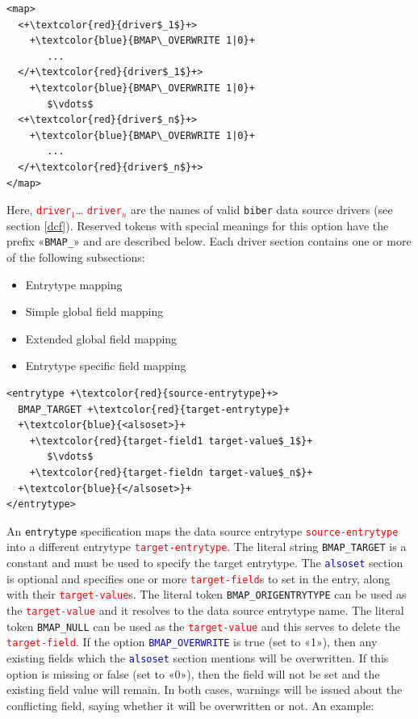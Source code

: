 \documentclass{ltxdockit}
\begin{document}
\lstset{showspaces=false}
\begin{lstlisting}[escapechar=+,mathescape=true]
<map>
  <+\textcolor{red}{driver$_1$}+>
    +\textcolor{blue}{BMAP\_OVERWRITE 1|0}+
       ...
  </+\textcolor{red}{driver$_1$}+>
    +\textcolor{blue}{BMAP\_OVERWRITE 1|0}+
       $\vdots$
  <+\textcolor{red}{driver$_n$}+>
    +\textcolor{blue}{BMAP\_OVERWRITE 1|0}+
       ...
  </+\textcolor{red}{driver$_n$}+>
</map>
\end{lstlisting}

\noindent Here, \textcolor{red}{\texttt{driver$_1$}}\ldots
\textcolor{red}{\texttt{driver$_n$}} are the names of valid \verb+biber+ data
source drivers (see section \ref{dcf}). Reserved tokens with special meanings for
this option have the prefix «\verb+BMAP_+» and are described below. Each
driver section contains one or more of the following subsections:

\begin{itemize}
\item Entrytype mapping
\item Simple global field mapping
\item Extended global field mapping
\item Entrytype specific field mapping
\end{itemize}


\lstset{showspaces=false}
\begin{lstlisting}[escapechar=+,mathescape=true]
<entrytype +\textcolor{red}{source-entrytype}+>
  BMAP_TARGET +\textcolor{red}{target-entrytype}+
  +\textcolor{blue}{<alsoset>}+
    +\textcolor{red}{target-field1 target-value$_1$}+
       $\vdots$
    +\textcolor{red}{target-fieldn target-value$_n$}+
  +\textcolor{blue}{</alsoset>}+
</entrytype>
\end{lstlisting}

\noindent An \verb+entrytype+ specification maps the data source entrytype
\textcolor{red}{\texttt{source-entrytype}} into a different
entrytype \textcolor{red}{\texttt{target-entrytype}}. The literal string
\verb+BMAP_TARGET+ is a constant and must be used to specify the target
entrytype. The \textcolor{blue}{\texttt{alsoset}} section is optional and
specifies one or more \textcolor{red}{\texttt{target-field}}s to set in the
entry, along with their \textcolor{red}{\texttt{target-value}}s. The
literal token \verb+BMAP_ORIGENTRYTYPE+ can be used as the
\textcolor{red}{\texttt{target-value}} and it resolves to the data source
entrytype name. The literal token \verb+BMAP_NULL+ can be used as the
\textcolor{red}{\texttt{target-value}} and this serves to delete the
\textcolor{red}{\texttt{target-field}}. If the option
\textcolor{blue}{\texttt{BMAP\_OVERWRITE}} is true (set to «1»), then any
existing fields which the \textcolor{blue}{\texttt{alsoset}} section
mentions will be overwritten. If this option is missing or false (set to
«0»), then the field will not be set and the existing field value will
remain. In both cases, warnings will be issued about the conflicting field,
saying whether it will be overwritten or not. An example:
\end{document}

